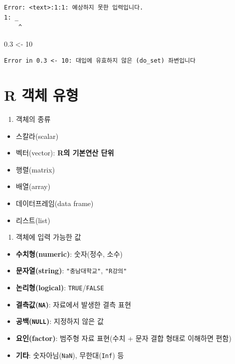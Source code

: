 \documentclass[11pt,a4paper]{book}
\newenvironment{Shaded}{\begin{snugshade}}{\end{snugshade}}
\newcommand{\DecValTok}[1]{\textcolor[rgb]{0.00,0.00,0.81}{#1}}
\newcommand{\FloatTok}[1]{\textcolor[rgb]{0.00,0.00,0.81}{#1}}
\newcommand{\StringTok}[1]{\textcolor[rgb]{0.31,0.60,0.02}{#1}}
\newcommand{\NormalTok}[1]{#1}
\providecommand{\tightlist}{%
  \setlength{\itemsep}{0pt}\setlength{\parskip}{0pt}}
\theoremstyle{definition}
\theoremstyle{definition}
\theoremstyle{definition}
\theoremstyle{remark}
\begin{document}
\begin{verbatim}
Error: <text>:1:1: 예상하지 못한 입력입니다.
1: _
    ^
\end{verbatim}

\normalsize

\footnotesize

\begin{Shaded}
\begin{Highlighting}[]
\FloatTok{0.3}\NormalTok{ <-}\StringTok{ }\DecValTok{10}
\end{Highlighting}
\end{Shaded}

\begin{verbatim}
Error in 0.3 <- 10: 대입에 유효하지 않은 (do_set) 좌변입니다
\end{verbatim}

\normalsize

\section{R 객체 유형}\label{r--}

\begin{enumerate}
\def\labelenumi{\arabic{enumi}.}
\tightlist
\item
  객체의 종류
\end{enumerate}

\begin{itemize}
\tightlist
\item
  스칼라(scalar)
\item
  벡터(vector): \textbf{R의 기본연산 단위}
\item
  행렬(matrix)
\item
  배열(array)
\item
  데이터프레임(data frame)
\item
  리스트(list)
\end{itemize}

\begin{enumerate}
\def\labelenumi{\arabic{enumi}.}
\setcounter{enumi}{1}
\tightlist
\item
  객체에 입력 가능한 값
\end{enumerate}

\begin{itemize}
\item
  \textbf{수치형(numeric)}: 숫자(정수, 소수)
\item
  \textbf{문자열(string)}: \texttt{"충남대학교"}, \texttt{"R강의"}
\item
  \textbf{논리형(logical)}: \texttt{TRUE}/\texttt{FALSE}
\item
  \textbf{결측값(\texttt{NA})}: 자료에서 발생한 결측 표현
\item
  \textbf{공백(\texttt{NULL})}: 지정하지 않은 값
\item
  \textbf{요인(factor)}: 범주형 자료 표현(수치 + 문자 결합 형태로
  이해하면 편함)
\item
  \textbf{기타}: 숫자아님(\texttt{NaN}), 무한대(\texttt{Inf}) 등
\end{itemize}
\end{document}
